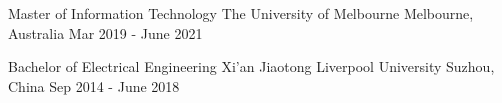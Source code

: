 

\begin{cventries}

\cventry
    {Master of Information Technology} %
    {The University of Melbourne} %
    {Melbourne, Australia} %
    {Mar 2019 - June 2021} %
    {}

    

\cventry
    {Bachelor of Electrical Engineering} %
    {Xi’an Jiaotong Liverpool University} %
    {Suzhou, China} %
    {Sep 2014 - June 2018} %
    {}
\end{cventries}




